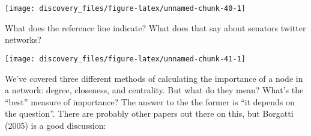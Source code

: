 \documentclass[]{book}
\newenvironment{Shaded}{\begin{snugshade}}{\end{snugshade}}
\newcommand{\DataTypeTok}[1]{\textcolor[rgb]{0.13,0.29,0.53}{#1}}
\newcommand{\DecValTok}[1]{\textcolor[rgb]{0.00,0.00,0.81}{#1}}
\newcommand{\KeywordTok}[1]{\textcolor[rgb]{0.13,0.29,0.53}{\textbf{#1}}}
\newcommand{\NormalTok}[1]{#1}
\newcommand{\OperatorTok}[1]{\textcolor[rgb]{0.81,0.36,0.00}{\textbf{#1}}}
\newcommand{\OtherTok}[1]{\textcolor[rgb]{0.56,0.35,0.01}{#1}}
\newcommand{\StringTok}[1]{\textcolor[rgb]{0.31,0.60,0.02}{#1}}
\theoremstyle{definition}
\theoremstyle{definition}
\theoremstyle{definition}
\theoremstyle{remark}
\begin{document}
\begin{center}\texttt{[image: discovery\_files/figure-latex/unnamed-chunk-40-1]} \end{center}

What does the reference line indicate? What does that say about senators
twitter networks?

\begin{Shaded}
\end{Shaded}

\begin{center}\texttt{[image: discovery\_files/figure-latex/unnamed-chunk-41-1]} \end{center}

We've covered three different methods of calculating the importance of a
node in a network: degree, closeness, and centrality. But what do they
mean? What's the ``best'' measure of importance? The answer to the the
former is ``it depends on the question''. There are probably other
papers out there on this, but Borgatti (2005) is a good discussion:
\end{document}

